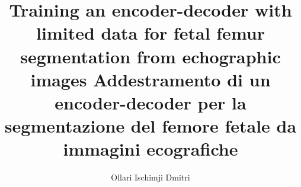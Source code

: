 \documentclass[12pt]{article}
\begin{document}
\title{
	Training an encoder-decoder with limited data for fetal femur segmentation from echographic images \newline
	\large Addestramento di un encoder-decoder per la segmentazione del femore fetale da immagini ecografiche}
\author{Ollari Ischimji Dmitri}

\maketitle

\newpage

\tableofcontents
\listoffigures
\listoftables

\newpage





\newpage


\end{document}
